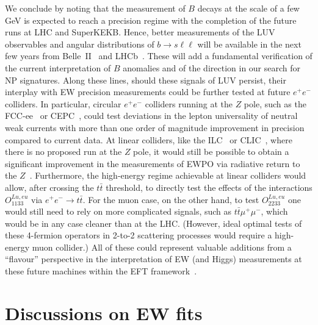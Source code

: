 We conclude by noting that the measurement of $B$ decays at the scale of a few GeV is expected to reach a precision regime with the completion of the future runs at LHC and SuperKEKB. Hence, better measurements of the LUV observables and angular distributions of $b\to s \ell \ell$ will be available in the next few years from Belle~II~\cite{Kou:2018nap} and LHCb~\cite{Bediaga:2018lhg}. These will add a fundamental verification of the current interpretation of $B$ anomalies and of the direction in our search for NP signatures. 
%
Along these lines, should these signals of LUV persist, their interplay with EW precision measurements could be further tested at future $e^+ e^-$ colliders. In particular, circular $e^+ e^-$ colliders running at the $Z$ pole, such as the FCC-ee~\cite{Abada:2019lih,Abada:2019zxq} or CEPC~\cite{CEPCStudyGroup:2018ghi}, could test deviations in the lepton universality of neutral weak currents with more than one order of magnitude improvement in precision compared to current data. At linear colliders, like the ILC~\cite{Bambade:2019fyw} or CLIC~\cite{deBlas:2018mhx}, where there is no proposed run at the $Z$ pole, it would still be possible to obtain a significant improvement in the measurements of EWPO via radiative return to the $Z$~\cite{Fujii:2019zll}. 
%
Furthermore, the high-energy regime achievable at linear colliders would allow, after crossing the $t\bar{t}$ threshold, to directly test the effects of the interactions $O^{Lu,eu}_{1133}$ via $e^+ e^- \to t\bar{t}$. 
For the muon case, on the other hand, to test $O^{Lu,eu}_{2233}$ one would still need to rely on more complicated signals, such as $t\bar{t}\mu^+\mu^-$, which would be in any case cleaner than at the LHC. (However, ideal optimal tests of these 4-fermion operators in 2-to-2 scattering processes would require a high-energy muon collider.) All of these could represent valuable additions from a ``flavour'' perspective in the interpretation of EW (and Higgs) measurements at these future machines within the EFT framework~\cite{deBlas:2019rxi,deBlas:2019wgy}.



\section{Discussions on EW fits}
\label{app:EW}

